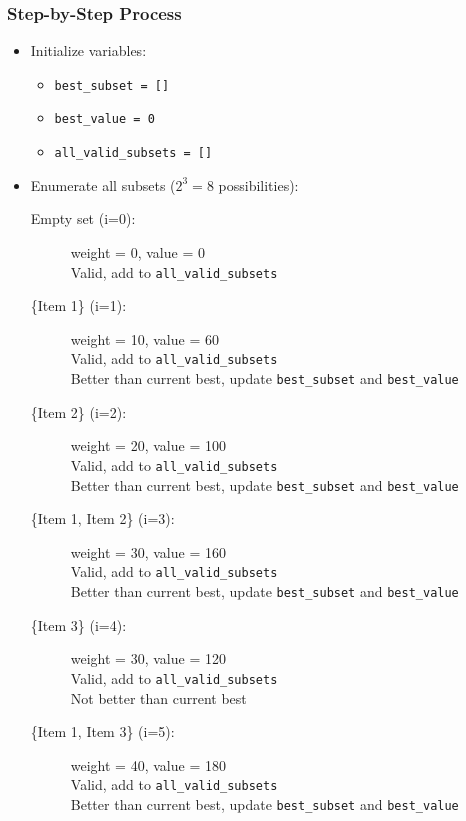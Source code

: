 \documentclass{article}
\begin{document}
\subsubsection*{Step-by-Step Process}
\begin{itemize}
    \item Initialize variables:
    \begin{itemize}
        \item \texttt{best\_subset = []}
        \item \texttt{best\_value = 0}
        \item \texttt{all\_valid\_subsets = []}
    \end{itemize}

    \item Enumerate all subsets ($2^3 = 8$ possibilities):
    \begin{description}
        \item[Empty set (i=0):] weight = 0, value = 0 \\
        Valid, add to \texttt{all\_valid\_subsets}
        
        \item[\{Item 1\} (i=1):] weight = 10, value = 60 \\
        Valid, add to \texttt{all\_valid\_subsets} \\
        Better than current best, update \texttt{best\_subset} and \texttt{best\_value}
        
        \item[\{Item 2\} (i=2):] weight = 20, value = 100 \\
        Valid, add to \texttt{all\_valid\_subsets} \\
        Better than current best, update \texttt{best\_subset} and \texttt{best\_value}
        
        \item[\{Item 1, Item 2\} (i=3):] weight = 30, value = 160 \\
        Valid, add to \texttt{all\_valid\_subsets} \\
        Better than current best, update \texttt{best\_subset} and \texttt{best\_value}
        
        \item[\{Item 3\} (i=4):] weight = 30, value = 120 \\
        Valid, add to \texttt{all\_valid\_subsets} \\
        Not better than current best
        
        \item[\{Item 1, Item 3\} (i=5):] weight = 40, value = 180 \\
        Valid, add to \texttt{all\_valid\_subsets} \\
        Better than current best, update \texttt{best\_subset} and \texttt{best\_value}
        

\end{description}
\end{itemize}
\end{document}
